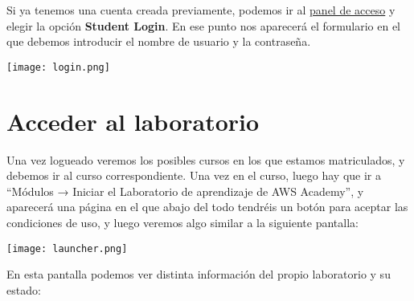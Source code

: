 Si ya tenemos una cuenta creada previamente, podemos ir al \href{https://www.awsacademy.com/vforcesite/LMS_Login}{panel de acceso} y elegir la opción \textbf{Student Login}. En ese punto nos aparecerá el formulario en el que debemos introducir el nombre de usuario y la contraseña.

\begin{center}
	\texttt{[image: login.png]}
\end{center}

\chapter{Acceder al laboratorio}

Una vez logueado veremos los posibles cursos en los que estamos matriculados, y debemos ir al curso correspondiente. Una vez en el curso, luego hay que ir a “Módulos → Iniciar el Laboratorio de aprendizaje de AWS Academy”, y aparecerá una página en el que abajo del todo tendréis un botón para aceptar las condiciones de uso, y luego veremos algo similar a la siguiente pantalla:

\begin{center}
	\texttt{[image: launcher.png]}
\end{center}

En esta pantalla podemos ver distinta información del propio laboratorio y su estado:

